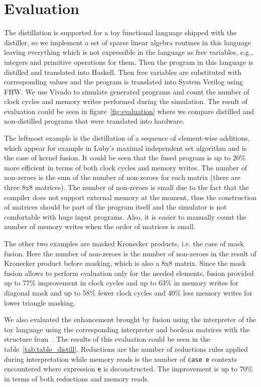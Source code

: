 \documentclass[10pt,conference]{IEEEtran}
\begin{document}
\section{Evaluation}

The distillation is supported for a toy functional language shipped with the distiller, so we implement a set of sparse linear algebra routines in this language leaving everything which is not expressible in the language as free variables, e.g., integers and primitive operations for them.
Then the program in this language is distilled and translated into Haskell. Then free variables are substituted with corresponding values and the program is translated into System Verilog using FHW.
We use Vivado to simulate generated programs and count the number of clock cycles and memory writes performed during the simulation. 
The result of evaluation could be seen in figure~\ref{fig:evaluation} where we compare distilled and non-distilled programs that were translated into hardware.

The leftmost example is the distillation of a sequence of element-wise additions, which appear for example in Luby’s maximal independent set algorithm and is the case of kernel fusion. 
It could be seen that the fused program is up to 20\% more efficient in terms of both clock cycles and memory writes. 
The number of non-zeroes is the sum of the number of non-zeroes for each matrix (there are three 8x8 matrices). The number of non-zeroes is small due to the fact that the compiler does not support external memory at the moment, thus the construction of matrices should be part of the program itself and the simulator is not comfortable with huge input programs. Also, it is easier to manually count the number of memory writes when the order of matrices is small.

The other two examples are masked Kronecker products, i.e. the case of mask fusion. Here the number of non-zeroes is the number of non-zeroes in the result of Kronecker product before masking, which is also a 8x8 matrix.
Since the mask fusion allows to perform evaluation only for the needed elements, fusion provided up to 77\% improvement in clock cycles and up to 63\% in memory writes for diagonal mask and up to 58\% fewer clock cycles and 40\% less memory writes for lower triangle masking. 

We also evaluated the enhancement brought by fusion using the interpreter of the toy language using the corresponding interpreter and boolean matrices with the structure from~\cite{SuiteSparseMatrixCollection}. The results of this evaluation could be seen in the table~\ref{tab:table_distill}.
Reductions are the number of reductions rules applied during interpretation while memory reads is the number of \texttt{case e} contexts encountered where expression \texttt{e} is deconstructed. The improvement is up to 70\% in terms of both reductions and memory reads. 
\end{document}
